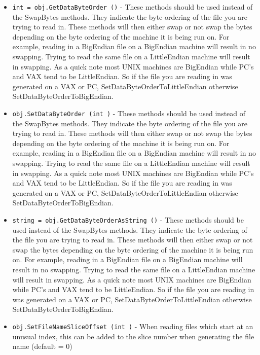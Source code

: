 \begin{itemize}
\item  \verb|int = obj.GetDataByteOrder ()| -  These methods should be used instead of the SwapBytes methods.
 They indicate the byte ordering of the file you are trying
 to read in. These methods will then either swap or not swap
 the bytes depending on the byte ordering of the machine it is
 being run on. For example, reading in a BigEndian file on a
 BigEndian machine will result in no swapping. Trying to read
 the same file on a LittleEndian machine will result in swapping.
 As a quick note most UNIX machines are BigEndian while PC's
 and VAX tend to be LittleEndian. So if the file you are reading
 in was generated on a VAX or PC, SetDataByteOrderToLittleEndian 
 otherwise SetDataByteOrderToBigEndian. 

\item  \verb|obj.SetDataByteOrder (int )| -  These methods should be used instead of the SwapBytes methods.
 They indicate the byte ordering of the file you are trying
 to read in. These methods will then either swap or not swap
 the bytes depending on the byte ordering of the machine it is
 being run on. For example, reading in a BigEndian file on a
 BigEndian machine will result in no swapping. Trying to read
 the same file on a LittleEndian machine will result in swapping.
 As a quick note most UNIX machines are BigEndian while PC's
 and VAX tend to be LittleEndian. So if the file you are reading
 in was generated on a VAX or PC, SetDataByteOrderToLittleEndian 
 otherwise SetDataByteOrderToBigEndian. 

\item  \verb|string = obj.GetDataByteOrderAsString ()| -  These methods should be used instead of the SwapBytes methods.
 They indicate the byte ordering of the file you are trying
 to read in. These methods will then either swap or not swap
 the bytes depending on the byte ordering of the machine it is
 being run on. For example, reading in a BigEndian file on a
 BigEndian machine will result in no swapping. Trying to read
 the same file on a LittleEndian machine will result in swapping.
 As a quick note most UNIX machines are BigEndian while PC's
 and VAX tend to be LittleEndian. So if the file you are reading
 in was generated on a VAX or PC, SetDataByteOrderToLittleEndian 
 otherwise SetDataByteOrderToBigEndian. 

\item  \verb|obj.SetFileNameSliceOffset (int )| -  When reading files which start at an unusual index, this can be added
 to the slice number when generating the file name (default = 0)


\end{itemize}
